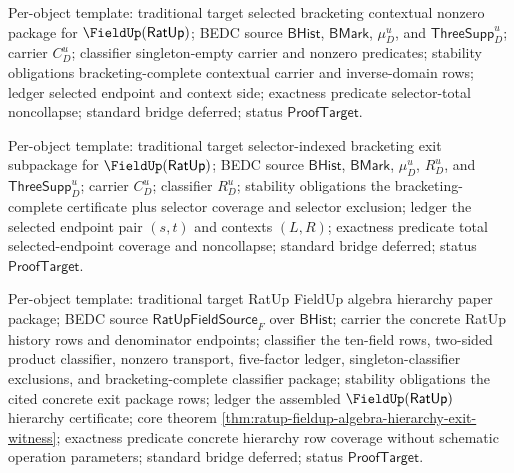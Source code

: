 
Per-object template: traditional target selected bracketing contextual nonzero
package for $\FieldUp(\mathsf{RatUp})$; BEDC source $\mathsf{BHist}$,
$\mathsf{BMark}$, $\mu_D^u$, and $\mathsf{ThreeSupp}_D^u$; carrier $C_D^u$;
classifier singleton-empty carrier and nonzero predicates; stability
obligations bracketing-complete contextual carrier and inverse-domain rows;
ledger selected endpoint and context side; exactness predicate selector-total
noncollapse; standard bridge deferred; status $\mathsf{ProofTarget}$.

Per-object template: traditional target selector-indexed bracketing exit
subpackage for $\FieldUp(\mathsf{RatUp})$; BEDC source $\mathsf{BHist}$,
$\mathsf{BMark}$, $\mu_D^u$, $R_D^u$, and $\mathsf{ThreeSupp}_D^u$; carrier
$C_D^u$; classifier $R_D^u$; stability obligations the bracketing-complete
certificate plus selector coverage and selector exclusion; ledger the selected
endpoint pair $(s,t)$ and contexts $(L,R)$; exactness predicate total
selected-endpoint coverage and noncollapse; standard bridge deferred; status
$\mathsf{ProofTarget}$.

Per-object template: traditional target RatUp FieldUp algebra hierarchy paper
package; BEDC source $\mathsf{RatUpFieldSource}_F$ over $\mathsf{BHist}$;
carrier the concrete RatUp history rows and denominator endpoints; classifier
the ten-field rows, two-sided product classifier, nonzero transport,
five-factor ledger, singleton-classifier exclusions, and bracketing-complete
classifier package; stability obligations the cited concrete exit package
rows; ledger the assembled $\FieldUp(\mathsf{RatUp})$ hierarchy certificate;
core theorem \autoref{thm:ratup-fieldup-algebra-hierarchy-exit-witness};
exactness predicate concrete hierarchy row coverage without schematic operation
parameters; standard bridge deferred; status $\mathsf{ProofTarget}$.


